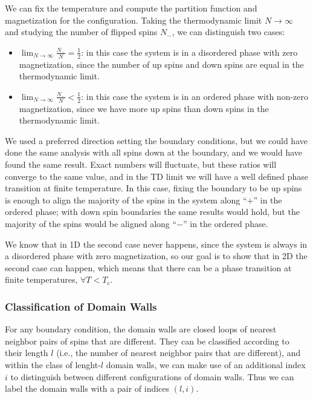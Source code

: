 We can fix the temperature and compute the partition function and magnetization for the configuration. Taking the thermodynamic limit \(N \to \infty\) and studying the number of flipped spins \(N_{-}\), we can distinguish two cases:
\begin{itemize}
  \item \(\lim_{N \to \infty} \frac{N_-}{N} = \frac{1}{2}\): in this case the system is in a disordered phase with zero magnetization, since the number of up spins and down spins are equal in the thermodynamic limit.
  \item \(\lim_{N \to \infty} \frac{N_-}{N} < \frac{1}{2}\): in this case the system is in an ordered phase with non-zero magnetization, since we have more up spins than down spins in the thermodynamic limit.
\end{itemize}
We used a preferred direction setting the boundary conditions, but we could have done the same analysis with all spins down at the boundary, and we would have found the same result. Exact numbers will fluctuate, but these ratios will converge to the same value, and in the TD limit we will have a well defined phase transition at finite temperature. In this case, fixing the boundary to be up spins is enough to align the majority of the spins in the system along ``\(+\)'' in the ordered phase; with down spin boundaries the same results would hold, but the majority of the spins would be aligned along ``\(-\)'' in the ordered phase.

We know that in 1D the second case never happens, since the system is always in a disordered phase with zero magnetization, so our goal is to show that in 2D the second case can happen, which means that there can be a phase transition at finite temperatures, \(\forall T < T_c\).

\subsubsection{Classification of Domain Walls}

For any boundary condition, the domain walls are closed loops of nearest neighbor pairs of spins that are different. They can be classified according to their length \(l\) (i.e., the number of nearest neighbor pairs that are different), and within the class of lenght-\(l\) domain walls, we can make use of an additional index \(i\) to distinguish between different configurations of domain walls. Thus we can label the domain walls with a pair of indices \((l,i)\).

